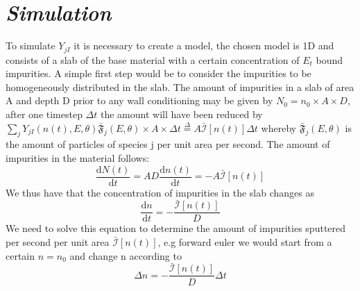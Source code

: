 \documentclass{article}
\begin{document}
\section*{\textit{Simulation}} 
To simulate $Y_{jI}$ it is necessary to create a model, the chosen model is 1D
and consists of a slab of the base material with a certain concentration of
$E_t$ bound impurities. A simple first step would be to consider the impurities
to be homogeneously distributed in the slab.
The amount of impurities in a slab of area A and depth D prior to any 
wall conditioning may be given by
$N_0 = n_0\times A \times D$, after one timestep $\Delta t$ the amount will have been reduced
by $\sum_jY_{jI}(n(t),E,\theta)\bar{\mathfrak{F}}_j(E,\theta)\times A\times\Delta t\stackrel{\Delta}{=}A\bar{\mathcal{I}}[n(t)]\Delta t $ 
whereby $\bar{\mathfrak{F}}_j(E,\theta)$ is the amount of particles of species j per unit area per second.
The amount of impurities in the material follows:
\begin{equation}
    \frac{\text{d}N(t)}{\text{d}t} = AD\frac{\text{d}n(t)}{\text{d}t} = -A\bar{\mathcal{I}}[n(t)]
\end{equation}
We thus have that the concentration of impurities in the slab changes as 
\begin{equation}
    \frac{\text{d} n}{\text{d} t} = -\frac{\bar{\mathcal{I}}[n(t)]}{D}
\end{equation}
We need to solve this equation to determine the amount of impurities sputtered per second per unit area
$\bar{\mathcal{I}}[n(t)]$, e.g forward euler we would start from a certain $n = n_0$ and change n according
to
\begin{equation}
    \Delta n = -\frac{\bar{\mathcal{I}}[n(t)]}{D}\Delta t
\end{equation}
\end{document}
